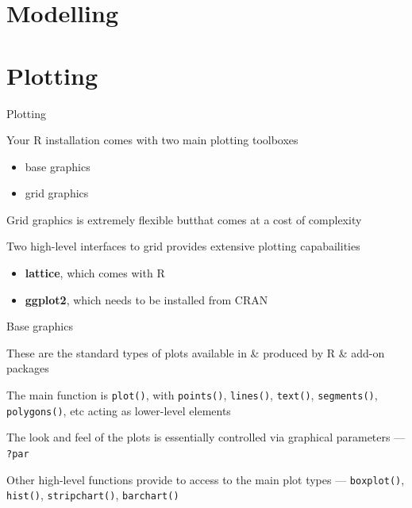 \documentclass[10pt,ignorenonframetext,compress, aspectratio=169]{beamer}
\begin{document}
\section{Modelling}\label{modelling}

\section{Plotting}\label{plotting}

\begin{frame}{Plotting}

Your R installation comes with two main plotting toolboxes

\begin{itemize}
\itemsep1pt\parskip0pt
\item
  base graphics
\item
  grid graphics
\end{itemize}

Grid graphics is extremely flexible butthat comes at a cost of
complexity

Two high-level interfaces to grid provides extensive plotting
capabailities

\begin{itemize}
\itemsep1pt\parskip0pt
\item
  \textbf{lattice}, which comes with R
\item
  \textbf{ggplot2}, which needs to be installed from CRAN
\end{itemize}

\end{frame}

\begin{frame}{Base graphics}

These are the standard types of plots available in \& produced by R \&
add-on packages

The main function is \texttt{plot()}, with \texttt{points()},
\texttt{lines()}, \texttt{text()}, \texttt{segments()},
\texttt{polygons()}, etc acting as lower-level elements

The look and feel of the plots is essentially controlled via
\alert{graphical parameters} --- \texttt{?par}

Other high-level functions provide to access to the main plot types ---
\texttt{boxplot()}, \texttt{hist()}, \texttt{stripchart()},
\texttt{barchart()}

\end{frame}
\end{document}
